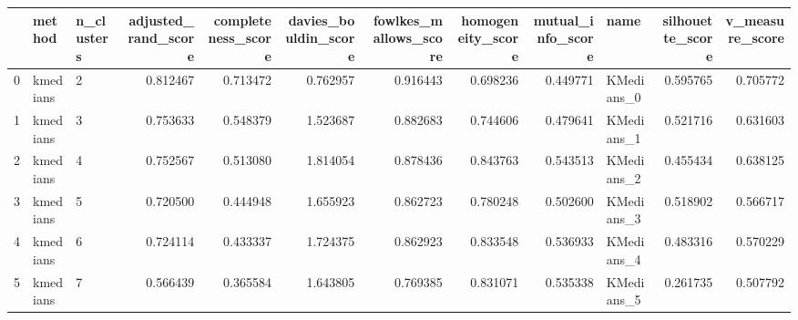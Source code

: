 \begin{tabular}{lllrrrrrrlrr}
\toprule
{} &    method & n\_clusters &  adjusted\_rand\_score &  completeness\_score &  davies\_bouldin\_score &  fowlkes\_mallows\_score &  homogeneity\_score &  mutual\_info\_score &        name &  silhouette\_score &  v\_measure\_score \\
\midrule
0 &  kmedians &          2 &             0.812467 &            0.713472 &              0.762957 &               0.916443 &           0.698236 &           0.449771 &  KMedians\_0 &          0.595765 &         0.705772 \\
1 &  kmedians &          3 &             0.753633 &            0.548379 &              1.523687 &               0.882683 &           0.744606 &           0.479641 &  KMedians\_1 &          0.521716 &         0.631603 \\
2 &  kmedians &          4 &             0.752567 &            0.513080 &              1.814054 &               0.878436 &           0.843763 &           0.543513 &  KMedians\_2 &          0.455434 &         0.638125 \\
3 &  kmedians &          5 &             0.720500 &            0.444948 &              1.655923 &               0.862723 &           0.780248 &           0.502600 &  KMedians\_3 &          0.518902 &         0.566717 \\
4 &  kmedians &          6 &             0.724114 &            0.433337 &              1.724375 &               0.862923 &           0.833548 &           0.536933 &  KMedians\_4 &          0.483316 &         0.570229 \\
5 &  kmedians &          7 &             0.566439 &            0.365584 &              1.643805 &               0.769385 &           0.831071 &           0.535338 &  KMedians\_5 &          0.261735 &         0.507792 \\
\bottomrule
\end{tabular}
